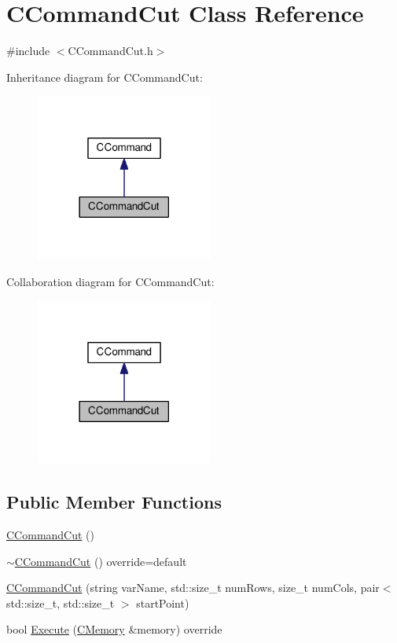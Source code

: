 \hypertarget{classCCommandCut}{}\section{C\+Command\+Cut Class Reference}
\label{classCCommandCut}


{\ttfamily \#include $<$C\+Command\+Cut.\+h$>$}



Inheritance diagram for C\+Command\+Cut\+:\nopagebreak
\begin{figure}[H]
\begin{center}
\leavevmode
\includegraphics[width=165pt]{classCCommandCut__inherit__graph}
\end{center}
\end{figure}


Collaboration diagram for C\+Command\+Cut\+:\nopagebreak
\begin{figure}[H]
\begin{center}
\leavevmode
\includegraphics[width=165pt]{classCCommandCut__coll__graph}
\end{center}
\end{figure}
\subsection*{Public Member Functions}
\begin{DoxyCompactItemize}
\item 
\hyperlink{classCCommandCut_aea6d6e3ee2b71412f0cd7d28ddf716a5}{C\+Command\+Cut} ()
\item 
\hyperlink{classCCommandCut_aa4c585b4f9fe99f10a39014329f02614}{$\sim$\+C\+Command\+Cut} () override=default
\item 
\hyperlink{classCCommandCut_adf50105fd0734790ab29a3bf1edfcd4e}{C\+Command\+Cut} (string var\+Name, std\+::size\+\_\+t num\+Rows, size\+\_\+t num\+Cols, pair$<$ std\+::size\+\_\+t, std\+::size\+\_\+t $>$ start\+Point)
\item 
bool \hyperlink{classCCommandCut_a18065504c797f4fde787a7dfd46bce74}{Execute} (\hyperlink{classCMemory}{C\+Memory} \&memory) override
\end{DoxyCompactItemize}
